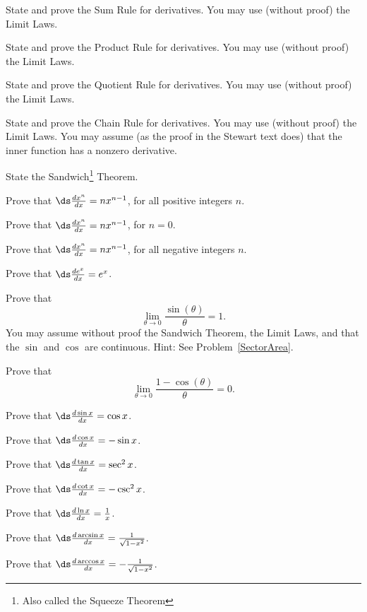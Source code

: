 \medskip
\begin{multicols}{2}

  \problem State and prove the Sum Rule for derivatives.  You may use
  (without proof) the Limit Laws.


  \problem State and prove the Product Rule for derivatives.  You may use
  (without proof) the Limit Laws.


  \problem State and prove the Quotient Rule for derivatives.  You may use
  (without proof) the Limit Laws.


  \problem State and prove the Chain Rule for derivatives.  You may use
  (without proof) the Limit Laws.  You may assume (as the proof in the
  Stewart text does) that the inner function has a nonzero derivative.


  \problem State the Sandwich\footnote{Also called the Squeeze Theorem}
  Theorem.


  \problem Prove that $\ds \frac{d x^n }{ dx} = nx^{n-1}$, for all positive
  integers $n$.


  \problem Prove that $\ds \frac{d x^n }{ dx} = nx^{n-1}$, for $n=0$.


  \problem Prove that $\ds \frac{d x^n }{ dx} = nx^{n-1}$, for all negative
  integers $n$.


  \problem Prove that $\ds \frac{d e^x }{ dx} = e^x$.


  \problem\label{sinOver} Prove that
  \[
  \lim_{\theta\to 0} \frac{\sin(\theta)}{\theta} = 1.
  \]
  You may assume without proof the Sandwich Theorem, the Limit Laws, and that
  the $\sin$ and $\cos$ are continuous.  Hint: See Problem~\ref{SectorArea}.


  \problem Prove that
  \[
  \lim_{\theta\to 0} \frac{1-\cos(\theta)}{\theta} = 0.
  \]


  \problem\label{sineDerivative}
  Prove that $\ds \frac{d \sin x}{ dx} = \cos x$.


  \problem\label{cosineDerivative}
  Prove that $\ds \frac{d \cos x }{ dx} = -\sin x$.


  \problem Prove that $\ds\frac{d \tan x }{ dx} = \sec^2 x$.


  \problem Prove that $\ds\frac{d \cot x }{ dx} = -\csc^2 x$.


  \problem Prove that $\ds\frac{d \ln x }{ dx} = \frac{1}{x}$.


  \problem Prove that $\ds \frac{d \arcsin x}{ dx} = \frac{1}{
  \sqrt{1-x^2}}$.


  \problem Prove that $\ds \frac{d \arccos x }{ dx} = -\frac{1}{
  \sqrt{1-x^2}}$.



\end{multicols}

